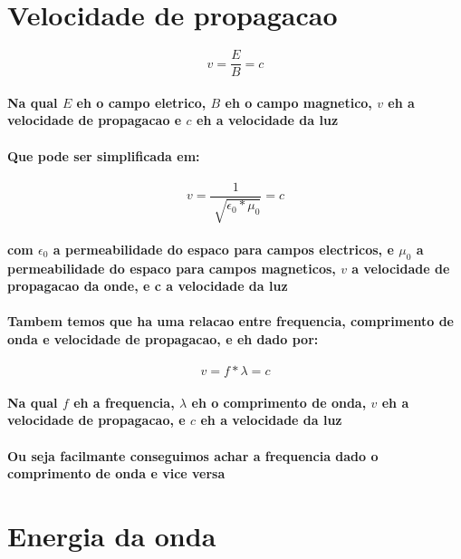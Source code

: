 \documentclass[12pt,twoside, a4paper, twocolumn]{article}
\begin{document}
\section{Velocidade de propagacao}
\begin{equation}
    v = \frac{E}{B} = c
\end{equation}
\paragraph*{Na qual $E$ eh o campo eletrico, $B$ eh o campo magnetico, $v$ eh a velocidade de propagacao e $c$ eh a velocidade da luz}
\paragraph*{Que pode ser simplificada em:}
\begin{equation}
    v = \frac{1}{\sqrt[]{\epsilon_0 * \mu_0}} = c
\end{equation}
\paragraph*{com $\epsilon_0$ a permeabilidade do espaco para campos electricos, e $\mu_0$ a permeabilidade do espaco para campos magneticos, $v$ a velocidade de propagacao da onde, e c a velocidade da luz}

\paragraph*{Tambem temos que ha uma relacao entre frequencia, comprimento de onda e velocidade de propagacao, e eh dado por:}

\begin{equation}
    v = f * \lambda = c
\end{equation}

\paragraph*{Na qual $f$ eh a frequencia, $\lambda$ eh o comprimento de onda, $v$ eh a velocidade de propagacao, e $c$ eh a velocidade da luz}
\paragraph*{Ou seja facilmante conseguimos achar a frequencia dado o comprimento de onda e vice versa}

\section{Energia da onda}
\end{document}
